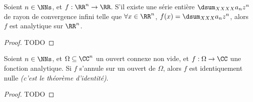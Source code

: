 \begin{fact} \label{multi-power-serie-vs-analytic}
    Soient $n \in \NNs$, et $f: \RR^n \rightarrow \RR$.
    S'il existe une série entière $\dsum_{XXXX} a_n z^n$ de rayon de convergence infini
    telle que
	$\forall x \in \RR^n$, $f(x) = \dsum_{XXX} a_n z^n$,
	alors
	$f$ est analytique sur $\RR^n$. 
\end{fact}


\begin{proof}
	TODO
\end{proof}



\begin{fact} \label{multi-analytic-identity}
    Soient $n \in \NNs$, et $\Omega \subseteq \CC^n$ un ouvert connexe non vide,
    et
    $f: \Omega \rightarrow \CC$ une fonction analytique.
	Si $f$ s'annule sur un ouvert de $\Omega$, alors $f$ est identiquement nulle
	\emph{(c'est le théorème d'identité)}.  
\end{fact}


\begin{proof}
	TODO
\end{proof}